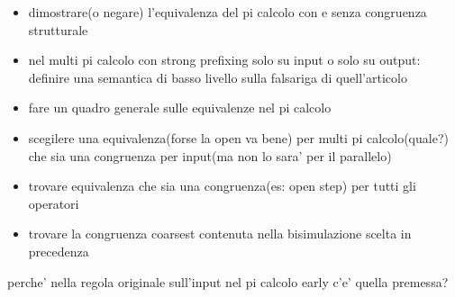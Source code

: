




\begin{itemize}
  \item
    dimostrare(o negare) l'equivalenza del pi calcolo con e senza congruenza strutturale
  \item
    nel multi pi calcolo con strong prefixing solo su input o solo su output: definire una semantica di basso livello sulla falsariga di quell'articolo
  \item
    fare un quadro generale sulle equivalenze nel pi calcolo
  \item
    scegilere una equivalenza(forse la open va bene) per multi pi calcolo(quale?) che sia una congruenza per input(ma non lo sara' per il parallelo)
  \item
    trovare equivalenza che sia una congruenza(es: open step) per tutti gli operatori
  \item
    trovare la congruenza coarsest contenuta nella bisimulazione scelta in precedenza
\end{itemize}

perche' nella regola originale sull'input nel pi calcolo early c'e' quella premessa?


